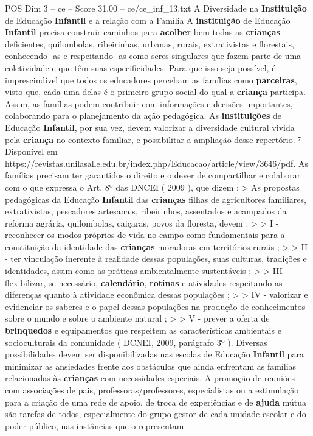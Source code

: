 \begin{textsample}{POS Dim 3 – ce – Score 31.00 – ce/ce\_inf\_13.txt}
A Diversidade na \textbf{Instituição} de Educação \textbf{Infantil} e a relação com a Família A \textbf{instituição} de Educação \textbf{Infantil} precisa construir caminhos para \textbf{acolher} bem todas as \textbf{crianças} deficientes, quilombolas, ribeirinhas, urbanas, rurais, extrativistas e florestais, conhecendo -as e respeitando -as como seres singulares que fazem parte de uma coletividade e que têm suas especificidades.
Para que isso seja possível, é imprescindível que todos os educadores percebam as famílias como \textbf{parceiras}, visto que, cada uma delas é o primeiro grupo social do qual a \textbf{criança} participa.
Assim, as famílias podem contribuir com informações e decisões importantes, colaborando para o planejamento da ação pedagógica.
As \textbf{instituições} de Educação \textbf{Infantil}, por sua vez, devem valorizar a diversidade cultural vivida pela \textbf{criança} no contexto familiar, e possibilitar a ampliação desse repertório. ⁷ Disponível em https://revistas.unilasalle.edu.br/index.php/Educacao/article/view/3646/pdf.
As famílias precisam ter garantidos o direito e o dever de compartilhar e colaborar com o que expressa o Art. 8º das DNCEI ( 2009 ), que dizem : > As propostas pedagógicas da Educação \textbf{Infantil} das \textbf{crianças} filhas de agricultores familiares, extrativistas, pescadores artesanais, ribeirinhos, assentados e acampados da reforma agrária, quilombolas, caiçaras, povos da floresta, devem : > > I - reconhecer os modos próprios de vida no campo como fundamentais para a constituição da identidade das \textbf{crianças} moradoras em territórios rurais ; > > II - ter vinculação inerente à realidade dessas populações, suas culturas, tradições e identidades, assim como as práticas ambientalmente sustentáveis ; > > III - flexibilizar, se necessário, \textbf{calendário}, \textbf{rotinas} e atividades respeitando as diferenças quanto à atividade econômica dessas populações ; > > IV - valorizar e evidenciar os saberes e o papel dessas populações na produção de conhecimentos sobre o mundo e sobre o ambiente natural ; > > V - prever a oferta de \textbf{brinquedos} e equipamentos que respeitem as características ambientais e socioculturais da comunidade ( DCNEI, 2009, parágrafo 3º ).
Diversas possibilidades devem ser disponibilizadas nas escolas de Educação \textbf{Infantil} para minimizar as ansiedades frente aos obstáculos que ainda enfrentam as famílias relacionadas às \textbf{crianças} com necessidades especiais.
A promoção de reuniões com associações de pais, professoras/professores, especialistas ou a estimulação para a criação de uma rede de apoio, de troca de experiências e de \textbf{ajuda} mútua são tarefas de todos, especialmente do grupo gestor de cada unidade escolar e do poder público, nas instâncias que o representam.

\end{textsample}
